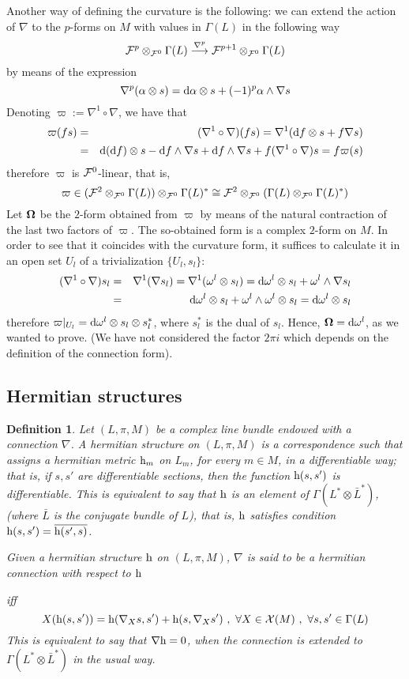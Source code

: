 \documentclass[12pt]{article}
\newtheorem{definition}{Definition}
\def\beann{\begin{eqnarray*}}
\def\eeann{\end{eqnarray*}}
\def\mapping#1{\mathrel{\mathop{\longrightarrow}\limits^{#1}}}
\def\d{{\rm d}}
\def\h{{\rm h}}
\def\curv{{\bf \Omega}}
\begin{document}
Another way of defining the curvature is the following:
we can extend the action of $\nabla$
to the $p$-forms on $M$  with values in $\Gamma (L)$
in the following way
$$
{\cal F}^p \otimes_{{\cal F}^0} \Gamma (L) \mapping{\nabla^p}
{\cal F}^{p+1} \otimes_{{\cal F}^0} \Gamma (L)
$$
by means of the expression
$$
\nabla^p(\alpha \otimes s) =
\d \alpha \otimes s + (-1)^p \alpha \wedge \nabla s
$$
Denoting
$\varpi := \nabla^1 \circ \nabla$,
we have that
\beann
\varpi (fs)&=&(\nabla^1 \circ \nabla )(fs) =
\nabla^1 (\d f \otimes s + f\nabla s)
\\
&=& \d (\d f)\otimes s - \d f \wedge \nabla s
+ \d f \wedge \nabla s + f(\nabla^1 \circ \nabla )s
=f\varpi (s)
\eeann
therefore $\varpi$ is ${\cal F}^0$-linear,
that is,
$$
\varpi \in ({\cal F}^2 \otimes_{{\cal F}^0} \Gamma (L))
\otimes_{{\cal F}^0} \Gamma (L)^*
\cong {\cal F}^2 \otimes_{{\cal F}^0} (\Gamma (L)
\otimes_{{\cal F}^0} \Gamma (L)^*)
$$
Let $\curv $ be the $2$-form
obtained from $\varpi$ by means of the
natural contraction of the last two factors of $\varpi$.
The so-obtained form is a complex $2$-form on $M$.
In order to see that it coincides
with the curvature form,
it suffices to calculate it in an open set $U_l$
of a trivialization $\{ U_l,s_l \}$:
\beann
(\nabla^1 \circ \nabla )s_l
&=&
\nabla^1 (\nabla s_l) =
\nabla^1 (\omega^l  \otimes s_l) =
\d \omega^l  \otimes s_l + \omega^l  \wedge \nabla s_l
\\
&=&
\d \omega^l  \otimes s_l + \omega^l  \wedge \omega^l \otimes s_l =
\d \omega^l  \otimes s_l
\eeann
therefore
$\varpi \vert_{U_l} = \d \omega^l  \otimes s_l \otimes s_l^*$,
where $s_l^*$ is the dual of $s_l$.
Hence, $\curv  = \d \omega^l $,
as we wanted to prove.
(We have not considered the factor
$2\pi i$ which depends on the definition of the connection form).



\subsection{Hermitian structures}


\begin{definition}
Let $(L,\pi ,M)$ be a complex line bundle
endowed with a connection $\nabla$.
A {\rm hermitian structure} on $(L,\pi ,M)$
is a correspondence such that assigns
a {\it hermitian metric} $\h_m$ on $L_m$, for every $m \in M$,
in a differentiable way; that is, if $s, s'$ are differentiable
sections,
then the function $\h (s,s')$ is differentiable.
This is equivalent to say that $\h$ is an element of
$\Gamma(L^* \otimes \bar L^*)$,
(where $\bar L$ is the conjugate bundle of $L$),
that is, $\h$ satisfies condition $\h(s,s') = \overline{\h(s',s)}$.

Given a hermitian structure $\h$ on $(L,\pi ,M)$,
$\nabla$ is said to be a {\rm hermitian connection} with respect to $\h$

iff
$$
X(\h (s,s')) = \h (\nabla_X s,s') + \h (s,\nabla_X s')
\ , \
\forall X \in {\cal X}(M)
\ , \
\forall s,s' \in \Gamma (L)
$$
This is equivalent to say that $\nabla \h = 0$,
when the connection is extended to $\Gamma(L^* \otimes \bar L^*)$
in the usual way.
\label{hs}
\end{definition}
\end{document}
